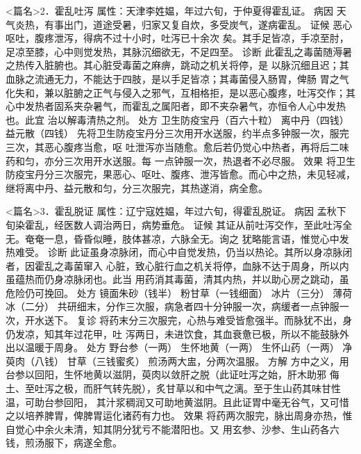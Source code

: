 \documentclass[a4paper,12pt,UTF8,twoside]{ctexbook}
\begin{document}
<篇名>2．霍乱吐泻
属性：天津李姓媪，年过六旬，于仲夏得霍乱证。 
病因 天气炎热，有事出门，道途受暑，归家又复自炊，多受炭气，遂病霍乱。 
证候 恶心呕吐，腹疼泄泻，得病不过十小时，吐泻已十余次 
矣。其手足皆凉，手凉至肘，足凉至膝，心中则觉发热，其脉沉细欲无，不足四至。 
诊断 此霍乱之毒菌随溽暑之热传入脏腑也。其心脏受毒菌之麻痹，跳动之机关将停，是 
以脉沉细且迟；其血脉之流通无力，不能达于四肢，是以手足皆凉；其毒菌侵入肠胃，俾肠 
胃之气化失和，兼以脏腑之正气与侵入之邪气，互相格拒，是以恶心腹疼，吐泻交作；其 
心中发热者固系夹杂暑气，而霍乱之属阳者，即不夹杂暑气，亦恒令人心中发热也。此宜 
治以解毒清热之剂。 
处方 卫生防疫宝丹（百六十粒） 离中丹（四钱） 益元散（四钱） 
先将卫生防疫宝丹分三次用开水送服，约半点多钟服一次，服完三次，其恶心腹疼当愈，呕 
吐泄泻亦当随愈。愈后若仍觉心中热者，再将后二味药和匀，亦分三次用开水送服。每 
一点钟服一次，热退者不必尽服。 
效果 将卫生防疫宝丹分三次服完，果恶心、呕吐、腹疼、泄泻皆愈。而心中之热，未见轻减， 
继将离中丹、益元散和匀，分三次服完，其热遂消，病全愈。 


<篇名>3．霍乱脱证
属性：辽宁寇姓媪，年过六旬，得霍乱脱证。 
病因 孟秋下旬染霍乱，经医数人调治两日，病势垂危。 
证候 其证从前吐泻交作，至此吐泻全无。奄奄一息，昏昏似睡，肢体甚凉，六脉全无。询之 
犹略能言语，惟觉心中发热难受。 
诊断 此证虽身凉脉闭，而心中自觉发热，仍当以热论。其所以身凉脉闭者，因霍乱之毒菌窜入 
心脏，致心脏行血之机关将停，血脉不达于周身，所以内虽蕴热而仍身凉脉闭也。此当 
用药消其毒菌，清其内热，并以助心房之跳动，虽危险仍可挽回。 
处方 镜面朱砂（钱半） 粉甘草（一钱细面） 冰片（三分） 薄荷冰（二分） 
共研细末，分作三次服，病急者四十分钟服一次，病缓者一点钟服一次，开水送下。 
复诊 将药末分三次服完，心热与难受皆愈强半。而脉犹不出，身仍发凉，知其年过花甲，吐 
泻两日，未进饮食，其血衰惫已极，所以不能鼓脉外出以温暖于周身。 
处方 野台参（一两） 生怀地黄（一两） 生怀山药（一两） 净萸肉（八钱） 甘草（三钱蜜炙） 
煎汤两大盅，分两次温服。 
方解 方中之义，用台参以回阳，生怀地黄以滋阴，萸肉以敛肝之脱（此证吐泻之始，肝木助邪 
侮土、至吐泻之极，而肝气转先脱），炙甘草以和中气之漓。至于生山药其味甘性温，可助台参回阳， 
其汁浆稠润又可助地黄滋阴。且此证胃中毫无谷气，又可惜之以培养脾胃，俾脾胃运化诸药有力也。 
效果 将药两次服完，脉出周身亦热，惟自觉心中余火未清，知其阴分犹亏不能潜阳也。又 
用玄参、沙参、生山药各六钱，煎汤服下，病遂全愈。 
\end{document}
